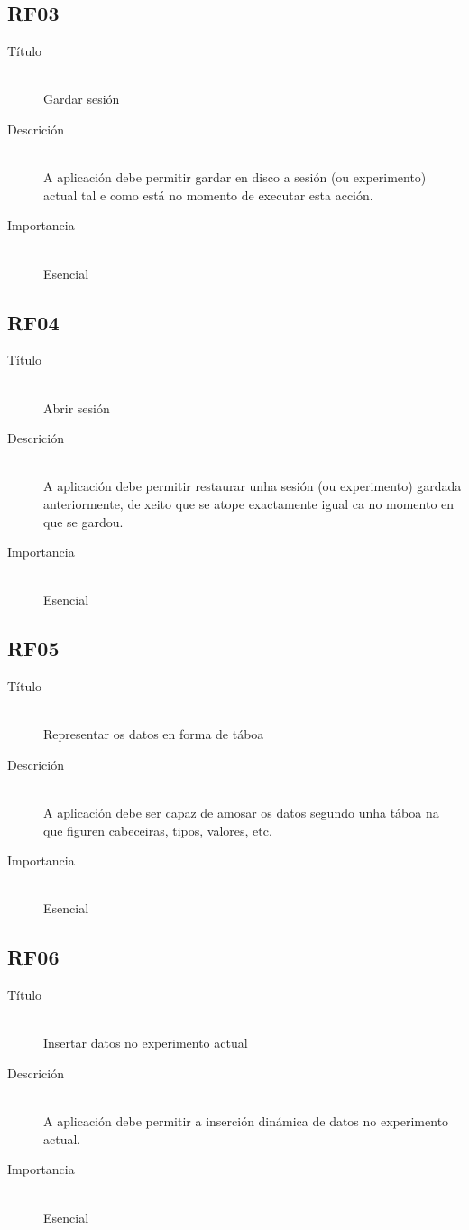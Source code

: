 \subsection*{RF03}
\begin{description}
\item[Título] \hfill \\
Gardar sesión
\item[Descrición] \hfill \\
A aplicación debe permitir gardar en disco a sesión (ou experimento) actual tal e como está no momento de executar esta acción.
\item[Importancia] \hfill \\
Esencial
\end{description}

\subsection*{RF04}
\begin{description}
\item[Título] \hfill \\
Abrir sesión
\item[Descrición] \hfill \\
A aplicación debe permitir restaurar unha sesión (ou experimento) gardada anteriormente, de xeito que se atope exactamente igual ca no momento en que se gardou.
\item[Importancia] \hfill \\
Esencial
\end{description}

\subsection*{RF05}
\begin{description}
\item[Título] \hfill \\
Representar os datos en forma de táboa
\item[Descrición] \hfill \\
A aplicación debe ser capaz de amosar os datos segundo unha táboa na que figuren cabeceiras, tipos, valores, etc.
\item[Importancia] \hfill \\
Esencial
\end{description}

\subsection*{RF06}
\begin{description}
\item[Título] \hfill \\
Insertar datos no experimento actual
\item[Descrición] \hfill \\
A aplicación debe permitir a inserción dinámica de datos no experimento actual.
\item[Importancia] \hfill \\
Esencial
\end{description}

